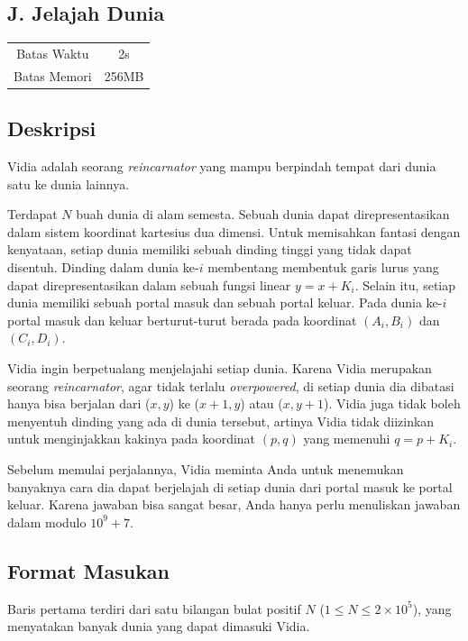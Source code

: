 \documentclass{article}
\begin{document}
\begin{center}
    \section*{J. Jelajah Dunia} %

    \begin{tabular}{ | c c | }
        \hline
        Batas Waktu  & 2s \\    %
        Batas Memori & 256MB \\  %
        \hline
    \end{tabular}
\end{center}

\subsection*{Deskripsi}
Vidia adalah seorang \textit{reincarnator} yang mampu berpindah tempat dari dunia satu ke dunia lainnya. 

Terdapat $N$ buah dunia di alam semesta. Sebuah dunia dapat direpresentasikan dalam sistem koordinat kartesius dua dimensi. Untuk memisahkan fantasi dengan kenyataan, setiap dunia memiliki sebuah dinding tinggi yang tidak dapat disentuh. Dinding dalam dunia ke-$i$ membentang membentuk garis lurus yang dapat direpresentasikan dalam sebuah fungsi linear $y = x + K_i$. Selain itu, setiap dunia memiliki sebuah portal masuk dan sebuah portal keluar. Pada dunia ke-$i$ portal masuk dan keluar berturut-turut berada pada koordinat $(A_{i}, B_{i})$ dan $(C_{i}, D_{i})$.

Vidia ingin berpetualang menjelajahi setiap dunia. Karena Vidia merupakan seorang \textit{reincarnator}, agar tidak terlalu \textit{overpowered}, di setiap dunia dia dibatasi hanya bisa berjalan dari ($x, y$) ke ($x + 1, y$) atau ($x, y + 1$). Vidia juga tidak boleh menyentuh dinding yang ada di dunia tersebut, artinya Vidia tidak diizinkan untuk menginjakkan kakinya pada koordinat $(p, q)$ yang memenuhi $q = p + K_{i}$.

Sebelum memulai perjalannya, Vidia meminta Anda untuk menemukan banyaknya cara dia dapat berjelajah di setiap dunia dari portal masuk ke portal keluar. Karena jawaban bisa sangat besar, Anda hanya perlu menuliskan jawaban dalam modulo $10^9+7$.

\subsection*{Format Masukan}
Baris pertama terdiri dari satu bilangan bulat positif $N$ ($1 \leq N \leq 2 \times 10^5$), yang menyatakan banyak dunia yang dapat dimasuki Vidia.
\end{document}
